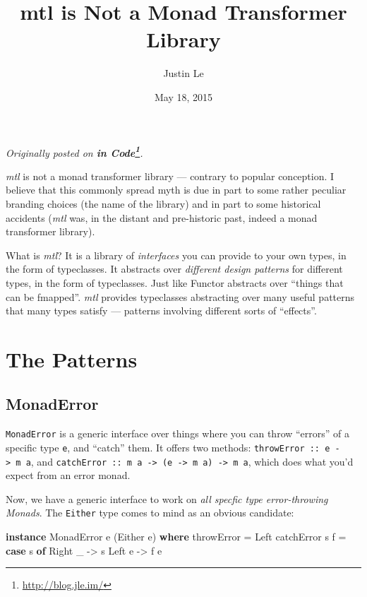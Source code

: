 \documentclass[]{article}
\title{mtl is Not a Monad Transformer Library}
\author{Justin Le}
\date{May 18, 2015}
\newenvironment{Shaded}{}{}
\newcommand{\KeywordTok}[1]{\textcolor[rgb]{0.00,0.44,0.13}{\textbf{{#1}}}}
\newcommand{\DataTypeTok}[1]{\textcolor[rgb]{0.56,0.13,0.00}{{#1}}}
\newcommand{\OtherTok}[1]{\textcolor[rgb]{0.00,0.44,0.13}{{#1}}}
\newcommand{\FunctionTok}[1]{\textcolor[rgb]{0.02,0.16,0.49}{{#1}}}
\newcommand{\NormalTok}[1]{{#1}}
\renewcommand{\href}[2]{#2\footnote{\url{#1}}}
\begin{document}
\maketitle

\emph{Originally posted on \textbf{\href{http://blog.jle.im/}{in
Code}}.}

\emph{mtl} is not a monad transformer library --- contrary to popular
conception. I believe that this commonly spread myth is due in part to
some rather peculiar branding choices (the name of the library) and in
part to some historical accidents (\emph{mtl} was, in the distant and
pre-historic past, indeed a monad transformer library).

What is \emph{mtl}? It is a library of \emph{interfaces} you can provide
to your own types, in the form of typeclasses. It abstracts over
\emph{different design patterns} for different types, in the form of
typeclasses. Just like Functor abstracts over ``things that can be
fmapped''. \emph{mtl} provides typeclasses abstracting over many useful
patterns that many types satisfy --- patterns involving different sorts
of ``effects''.

\section{The Patterns}\label{the-patterns}

\subsection{MonadError}\label{monaderror}

\texttt{MonadError} is a generic interface over things where you can
throw ``errors'' of a specific type \texttt{e}, and ``catch'' them. It
offers two methods: \texttt{throwError\ ::\ e\ -\textgreater{}\ m\ a},
and
\texttt{catchError\ ::\ m\ a\ -\textgreater{}\ (e\ -\textgreater{}\ m\ a)\ -\textgreater{}\ m\ a},
which does what you'd expect from an error monad.

Now, we have a generic interface to work on \emph{all specfic type
error-throwing Monads}. The \texttt{Either} type comes to mind as an
obvious candidate:

\begin{Shaded}
\begin{Highlighting}[]
\KeywordTok{instance} \DataTypeTok{MonadError} \NormalTok{e (}\DataTypeTok{Either} \NormalTok{e) }\KeywordTok{where}
    \NormalTok{throwError }\FunctionTok{=} \DataTypeTok{Left}
    \NormalTok{catchError s f }\FunctionTok{=} \KeywordTok{case} \NormalTok{s }\KeywordTok{of}
                       \DataTypeTok{Right} \NormalTok{_ }\OtherTok{->} \NormalTok{s}
                       \DataTypeTok{Left} \NormalTok{e  }\OtherTok{->} \NormalTok{f e}
\end{Highlighting}
\end{Shaded}
\end{document}
